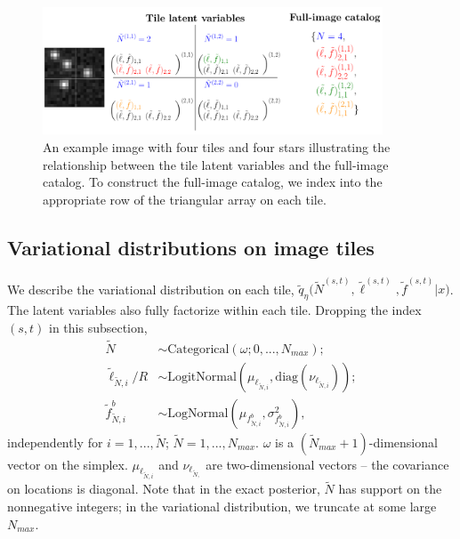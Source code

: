 \begin{figure}[tb]
    \centering
    \includegraphics[width = 0.9\textwidth]{figures/vi_figures/tile_to_full_schematic.png}
    \vspace{-0.6cm}
    \caption{An example image with four tiles and four stars illustrating the relationship between the tile latent variables and the full-image catalog.
    To construct the full-image catalog, we index into the appropriate row of the triangular array on each tile.}
    \label{fig:tile_to_full_schm}
\end{figure}


\subsection{Variational distributions on image tiles}
\label{sec:distr_on_tiles}
We describe the variational distribution on each tile,
$\tilde q_\eta\big(\tilde N^{(s, t)}, \tilde \ell^{(s, t)}, \tilde f^{(s, t)} | x\big)$.
The latent variables also fully factorize within each tile.
Dropping the index
$(s,t)$ in this subsection,
\begin{align}
    \tilde N &\sim \text{Categorical}(
    \omega; 0, ..., N_{max});  \label{eq:var_distr_n}\\
	\tilde \ell_{\tilde N, i} / R &\sim \text{LogitNormal}(\mu_{\ell_{\tilde N, i}}, \text{diag}(\nu_{\ell_{\tilde N, i}}) )\label{eq:var_distr_loc}; \\
	\tilde f^b_{\tilde N, i} &\sim \text{LogNormal}(\mu_{f^b_{\tilde N, i}}, \sigma^2_{f^b_{\tilde N, i}}), \label{eq:var_distr_f}
\end{align}
independently for $i = 1, ..., \tilde N$; $\tilde{N} = 1, ..., N_{max}$.
$\omega$ is a $(\tilde N_{max} + 1)$-dimensional vector on the simplex. $\mu_{\ell_{\tilde N, i}}$ and $\nu_{\ell_{\tilde N, }}$ are two-dimensional vectors -- the covariance on locations is diagonal.
Note that in the exact posterior, $\tilde N$ has support on the nonnegative integers; in the variational distribution, we truncate at some large $N_{max}$.



